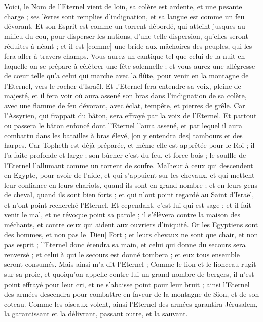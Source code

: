 \begin{multicols}{2}
Voici, le Nom de l'Eternel vient de loin, sa colère est ardente, et une pesante charge ; ses lèvres sont remplies d'indignation, et sa langue est comme un feu dévorant.
Et son Esprit est comme un torrent débordé, qui atteint jusques au milieu du cou, pour disperser les nations, d'une telle dispersion, qu'elles seront réduites à néant ; et il est [comme] une bride aux mâchoires des peuples, qui les fera aller à travers champs.
Vous aurez un cantique tel que celui de la nuit en laquelle on se prépare à célébrer une fête solennelle ; et vous aurez une allégresse de cœur telle qu'a celui qui marche avec la flûte, pour venir en la montagne de l'Eternel, vers le rocher d'Israël.
Et l'Eternel fera entendre sa voix, pleine de majesté, et il fera voir où aura assené son bras dans l'indignation de sa colère, avec une flamme de feu dévorant, avec éclat, tempête, et pierres de grêle.
Car l'Assyrien, qui frappait du bâton, sera effrayé par la voix de l'Eternel.
Et partout ou passera le bâton enfoncé dont l'Eternel l'aura assené, et par lequel il aura combattu dans les batailles à bras élevé, [on y entendra des] tambours et des harpes.
Car Topheth est déjà préparée, et même elle est apprêtée pour le Roi ; il l'a faite profonde et large ; son bûcher c'est du feu, et force bois ; le souffle de l'Eternel l'allumant comme un torrent de soufre.
\VerseOne{}Malheur à ceux qui descendent en Egypte, pour avoir de l'aide, et qui s'appuient sur les chevaux, et qui mettent leur confiance en leurs chariots, quand ils sont en grand nombre ; et en leurs gens de cheval, quand ils sont bien forts ; et qui n'ont point regardé au Saint d'Israël, et n'ont point recherché l'Eternel.
Et cependant, c'est lui qui est sage ; et il fait venir le mal, et ne révoque point sa parole ; il s'élèvera contre la maison des méchants, et contre ceux qui aident aux ouvriers d'iniquité.
Or les Egyptiens sont des hommes, et non pas le [Dieu] Fort ; et leurs chevaux ne sont que chair, et non pas esprit ; l'Eternel donc étendra sa main, et celui qui donne du secours sera renversé ; et celui à qui le secours est donné tombera ; et eux tous ensemble seront consumés.
Mais ainsi m'a dit l'Eternel ; Comme le lion et le lionceau rugit sur sa proie, et quoiqu'on appelle contre lui un grand nombre de bergers, il n'est point effrayé pour leur cri, et ne s'abaisse point pour leur bruit ; ainsi l'Eternel des armées descendra pour combattre en faveur de la montagne de Sion, et de son coteau.
Comme les oiseaux volent, ainsi l'Eternel des armées garantira Jérusalem, la garantissant et la délivrant, passant outre, et la sauvant.

\end{multicols}
